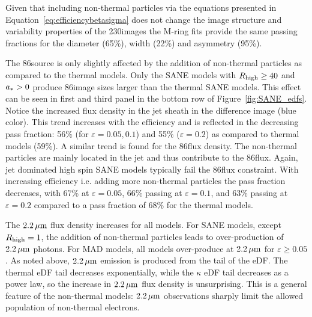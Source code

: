 
Given that including non-thermal particles via the equations presented in Equation~\ref{eq:efficiencybetasigma} does not change the image structure and variability properties of the 230\GHz images the M-ring fits provide the same passing fractions for the diameter (65\%), width (22\%) and asymmetry (95\%).


The 86\GHz source is only slightly affected by the addition of non-thermal particles as compared to the thermal models.
Only the SANE models with $R_\mathrm{high} \geq 40$ and $a_* > 0$ produce 86\GHz image sizes larger than the thermal SANE models.
This effect can be seen in  first and third panel in the bottom row of Figure~\ref{fig:SANE_edfs}.
Notice the increased flux density in the jet sheath in the difference image (blue color).
This trend increases with the efficiency and is reflected in the decreasing pass fraction: 56\% (for $\varepsilon=0.05,0.1$) and 55\% ($\varepsilon=0.2$) as compared to thermal models (59\%).
A similar trend is found for the 86\GHz flux density.
The non-thermal particles are mainly located in the jet and thus contribute to the 86\GHz flux.
Again, jet dominated high spin SANE models typically fail the 86\GHz flux constraint.
With increasing efficiency i.e.
adding more non-thermal particles the pass fraction decreases, with 67\%  at $\varepsilon=0.05$, 66\% passing at $\varepsilon=0.1$, and 63\% passing at  $\varepsilon=0.2$ compared to a pass fraction of
68\% for the thermal models.


The $2.2\,\mu\mathrm{m}$ flux density increases for all models.
For SANE models, except $R_\mathrm{high}=1$, the addition of non-thermal particles leads to over-production of $2.2\,\mu\mathrm{m}$ photons.
For MAD models, all models over-produce at $2.2\,\mu\mathrm{m}$ for $\varepsilon \ge 0.05$.
As noted above, $2.2\,\mu\mathrm{m}$ emission is produced from the tail of the eDF.
The thermal eDF tail decreases exponentially, while the $\kappa$ eDF tail decreases as a power law, so the increase in $2.2\,\mu\mathrm{m}$ flux density is unsurprising.
This is a general feature of the non-thermal models: $2.2\,\mu\mathrm{m}$ observations sharply limit the allowed population of non-thermal electrons.

